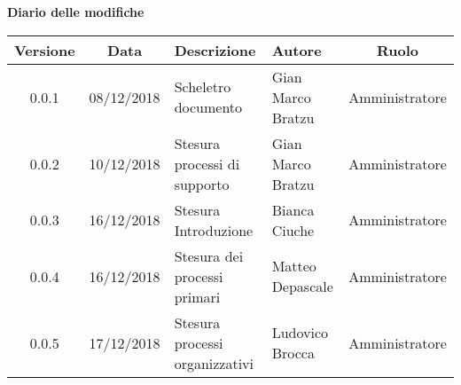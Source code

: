 	\begin{center}
		\textbf{Diario delle modifiche}
	\end{center}
	\begin{center}
		\begin{tabularx}{\textwidth}{|c|c|X|X|c|}
			\hline
			\textbf{Versione} & \textbf{Data} & \textbf{Descrizione} & \textbf{Autore} & \textbf{Ruolo} \\
			\hline
			0.0.1 & 08/12/2018 & Scheletro documento  & Gian Marco Bratzu & Amministratore\\
			0.0.2 & 10/12/2018 & Stesura processi di supporto & Gian Marco Bratzu & Amministratore\\	
			0.0.3 & 16/12/2018 & Stesura Introduzione & Bianca Ciuche & Amministratore\\
			0.0.4 & 16/12/2018 & Stesura dei processi primari & Matteo Depascale & Amministratore\\
			0.0.5 & 17/12/2018 & Stesura processi organizzativi & Ludovico Brocca & Amministratore\\
			\hline
		\end{tabularx}
	\end{center}

\newpage